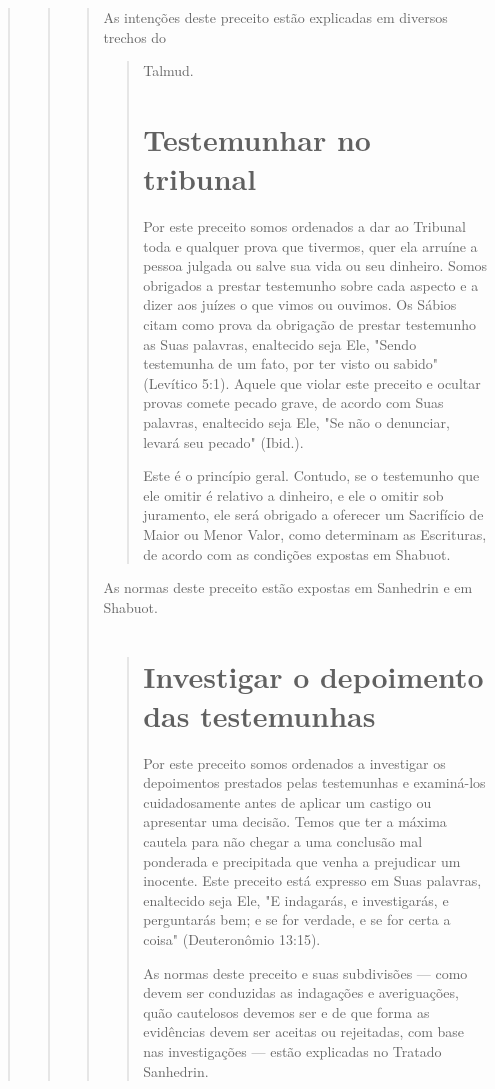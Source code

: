 \begin{quote}
\begin{quote}
\begin{quote}
As intenções deste preceito estão explicadas em diversos trechos do

\begin{quote}
Talmud.



\section{Testemunhar no tribunal}

Por este preceito somos ordenados a dar ao Tribunal toda e qual­quer
prova que tivermos, quer ela arruíne a pessoa julgada ou salve sua vida
ou seu dinheiro. Somos obrigados a prestar testemunho sobre cada aspecto
e a dizer aos juízes o que vimos ou ouvimos. Os Sábios citam como prova
da obrigação de prestar testemunho as Suas palavras, enaltecido seja
Ele, "Sendo testemunha de um fato, por ter visto ou sabido" (Levítico
5:1). Aquele que vio­lar este preceito e ocultar provas comete pecado
grave, de acordo com Suas palavras, enaltecido seja Ele, "Se não o
denunciar, levará seu pecado" (Ibid.).

Este é o princípio geral. Contudo, se o testemunho que ele omitir é
relativo a dinheiro, e ele o omitir sob juramento, ele será obrigado a
oferecer um Sacrifício de Maior ou Menor Valor, como determinam as
Escrituras, de acor­do com as condições expostas em Shabuot.
\end{quote}

As normas deste preceito estão expostas em Sanhedrin e em Shabuot.

\begin{quote}
\section{Investigar o depoimento das testemunhas}

Por este preceito somos ordenados a investigar os depoimentos pres­tados
pelas testemunhas e examiná-los cuidadosamente antes de aplicar um
cas­tigo ou apresentar uma decisão. Temos que ter a máxima cautela para
não che­gar a uma conclusão mal ponderada e precipitada que venha a
prejudicar um inocente. Este preceito está expresso em Suas palavras,
enaltecido seja Ele, "E indagarás, e investigarás, e perguntarás bem; e
se for verdade, e se for certa a coisa" (Deuteronômio 13:15).

As normas deste preceito e suas subdivisões --- como devem ser
con­duzidas as indagações e averiguações, quão cautelosos devemos ser e
de que forma as evidências devem ser aceitas ou rejeitadas, com base nas
investiga­ções --- estão explicadas no Tratado Sanhedrin.


\end{quote}
\end{quote}
\end{quote}
\end{quote}
